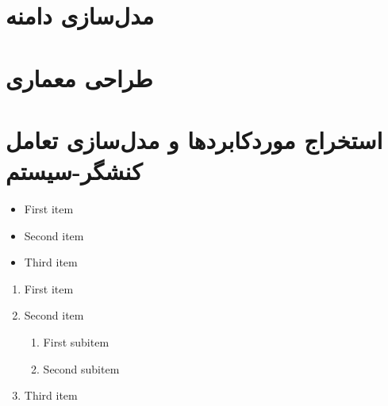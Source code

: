 \documentclass[12pt]{article}
\begin{document}
	\section{مدل‌سازی دامنه}

	\section{طراحی معماری}

	\section{استخراج موردکابردها و مدل‌سازی تعامل کنشگر-سیستم}

	\begin{itemize}
		\item First item
		\item Second item
		\item Third item
	\end{itemize}

	\begin{enumerate}
		\renewcommand{\labelenumi}{.R\arabic{enumi}}
		\item First item
		\item Second item
		\begin{enumerate}
			\renewcommand{\labelenumii}{.R\arabic{enumi}.\arabic{enumii}}
			\item First subitem
			\item Second subitem
		\end{enumerate}
		\item Third item
	\end{enumerate}
\end{document}
